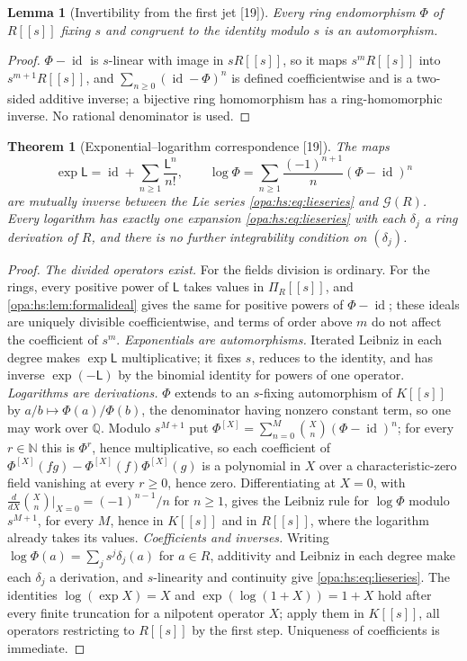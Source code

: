 \documentclass[11pt,oneside]{article}
\numberwithin{equation}{section}
\newtheorem{theorem}{Theorem}[section]
\newtheorem{lemma}[lemma]{Lemma}
\theoremstyle{definition}
\theoremstyle{remark}
\newcommand{\Q}{\mathbb Q}
\newcommand{\N}{\mathbb N}
\newcommand{\id}{\operatorname{id}}
\newcommand{\src}[1]{\textup{\textsf{\small[#1]}}}
\begin{document}
\begin{lemma}[Invertibility from the first jet \src{19}]\label{opa:hs:lem:inverse}
Every ring endomorphism $\Phi$ of $R[[s]]$ fixing $s$ and congruent to the identity modulo $s$ is an automorphism.
\end{lemma}
\begin{proof}
$\Phi-\id$ is $s$-linear with image in $sR[[s]]$, so it maps $s^mR[[s]]$ into $s^{m+1}R[[s]]$, and $\sum_{n\ge0}(\id-\Phi)^n$ is defined
coefficientwise and is a two-sided additive inverse; a bijective ring homomorphism has a ring-homomorphic inverse. No rational denominator is
used.
\end{proof}

\begin{theorem}[Exponential--logarithm correspondence \src{19}]\label{opa:hs:thm:fulllie}
The maps
\begin{equation}\label{opa:hs:eq:explog}
 \exp\mathsf L=\id+\sum_{n\ge1}\frac{\mathsf L^n}{n!},\qquad \log\Phi=\sum_{n\ge1}\frac{(-1)^{n+1}}n(\Phi-\id)^n
\end{equation}
are mutually inverse between the Lie series \eqref{opa:hs:eq:lieseries} and $\mathcal G(R)$. Every logarithm has exactly one expansion
\eqref{opa:hs:eq:lieseries} with each $\delta_j$ a ring derivation of $R$, and there is no further integrability condition on $(\delta_j)$.
\end{theorem}
\begin{proof}
\emph{The divided operators exist.} For the fields division is ordinary. For the rings, every positive power of $\mathsf L$ takes values in
$\Pi_R[[s]]$, and \cref{opa:hs:lem:formalideal} gives the same for positive powers of $\Phi-\id$; these ideals are uniquely divisible
coefficientwise, and terms of order above $m$ do not affect the coefficient of $s^m$.
\emph{Exponentials are automorphisms.} Iterated Leibniz in each degree makes $\exp\mathsf L$ multiplicative; it fixes $s$, reduces to the identity,
and has inverse $\exp(-\mathsf L)$ by the binomial identity for powers of one operator.
\emph{Logarithms are derivations.} $\Phi$ extends to an $s$-fixing automorphism of $K[[s]]$ by $a/b\mapsto\Phi(a)/\Phi(b)$, the denominator
having nonzero constant term, so one may work over $\Q$. Modulo $s^{M+1}$ put $\Phi^{[X]}=\sum_{n=0}^M\binom Xn(\Phi-\id)^n$; for every
$r\in\N$ this is $\Phi^r$, hence multiplicative, so each coefficient of $\Phi^{[X]}(fg)-\Phi^{[X]}(f)\Phi^{[X]}(g)$ is a polynomial in $X$ over a
characteristic-zero field vanishing at every $r\ge0$, hence zero. Differentiating at $X=0$, with
$\frac d{dX}\binom Xn\big|_{X=0}=(-1)^{n-1}/n$ for $n\ge1$, gives the Leibniz rule for $\log\Phi$ modulo $s^{M+1}$, for every $M$, hence in $K[[s]]$ and
in $R[[s]]$, where the logarithm already takes its values.
\emph{Coefficients and inverses.} Writing $\log\Phi(a)=\sum_js^j\delta_j(a)$ for $a\in R$, additivity and Leibniz in each degree make each $\delta_j$ a
derivation, and $s$-linearity and continuity give \eqref{opa:hs:eq:lieseries}. The identities $\log(\exp X)=X$ and $\exp(\log(1+X))=1+X$ hold after
every finite truncation for a nilpotent operator $X$; apply them in $K[[s]]$, all operators restricting to $R[[s]]$ by the first step. Uniqueness of
coefficients is immediate.
\end{proof}
\end{document}
